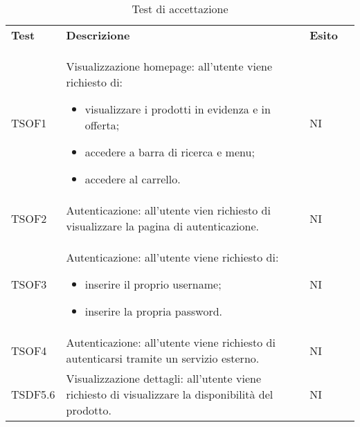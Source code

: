 \begin{center}
    \centering
    \renewcommand{\arraystretch}{1.8}
    \label{tab:TestAccettazione}
    \begin{longtable}[!h]{p{50px} p{245px} p{75px} p{50px}}
        \caption{Test di accettazione}                                                                                                                                                                                         \\
        \rowcolor{logo!70} \textbf{Test} & \textbf{Descrizione}                                                                                                                                               & \textbf{Esito} \\
        TSOF1                            & Visualizzazione homepage: all'utente viene richiesto di: \begin{itemize} \item visualizzare i prodotti in evidenza e in offerta; \item accedere a barra di ricerca e menu; \item accedere al carrello. \end{itemize}                                                                                   & NI             \\
        TSOF2                            & Autenticazione: all'utente vien richiesto di visualizzare la pagina di autenticazione.                                                                              & NI             \\
        TSOF3                            & Autenticazione: all'utente viene richiesto di: \begin{itemize} \item inserire il proprio username; \item inserire la propria password. \end{itemize}                                                                                           & NI             \\
        TSOF4                            & Autenticazione: all'utente viene richiesto di autenticarsi tramite un servizio esterno.                                                                             & NI             \\
        TSDF5.6                          & Visualizzazione dettagli: all'utente viene richiesto di visualizzare la disponibilità del prodotto.                      & NI             \\

\end{longtable}
\end{center}
